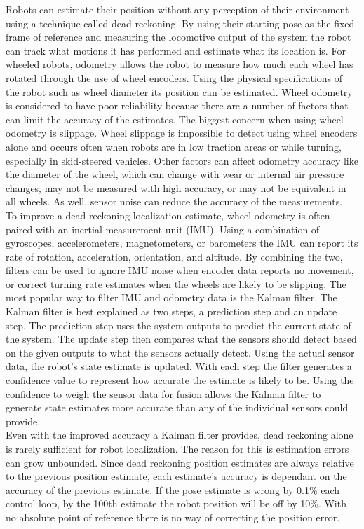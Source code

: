 Robots can estimate their position without any perception of their environment using a technique called dead reckoning. By using their starting pose as the fixed frame of reference and measuring the locomotive output of the system the robot can track what motions it has performed and estimate what its location is. For wheeled robots, odometry allows the robot to measure how much each wheel has rotated through the use of wheel encoders. Using the physical specifications of the robot such as wheel diameter its position can be estimated. Wheel odometry is considered to have poor reliability because there are a number of factors that can limit the accuracy of the estimates. The biggest concern when using wheel odometry is slippage. Wheel slippage is impossible to detect using wheel encoders alone and occurs often when robots are in low traction areas or while turning, especially in skid-steered vehicles. Other factors can affect odometry accuracy like the diameter of the wheel, which can change with wear or internal air pressure changes, may not be measured with high accuracy, or may not be equivalent in all wheels. As well, sensor noise can reduce the accuracy of the measurements.\\

To improve a dead reckoning localization estimate, wheel odometry is often paired with an inertial measurement unit (IMU). Using a combination of gyroscopes, accelerometers, magnetometers, or barometers the IMU can report its rate of rotation, acceleration, orientation, and altitude. By combining the two, filters can be used to ignore IMU noise when encoder data reports no movement, or correct turning rate estimates when the wheels are likely to be slipping. The most popular way to filter IMU and odometry data is the Kalman filter. The Kalman filter is best explained as two steps, a prediction step and an update step. The prediction step uses the system outputs to predict the current state of the system. The update step then compares what the sensors should detect based on the given outputs to what the sensors actually detect. Using the actual sensor data, the robot's state estimate is updated. With each step the filter generates a confidence value to represent how accurate the estimate is likely to be. Using the confidence to weigh the sensor data for fusion allows the Kalman filter to generate state estimates more accurate than any of the individual sensors could provide.\\

Even with the improved accuracy a Kalman filter provides, dead reckoning alone is rarely sufficient for robot localization. The reason for this is estimation errors can grow unbounded. Since dead reckoning position estimates are always relative to the previous position estimate, each estimate's accuracy is dependant on the accuracy of the previous estimate. If the pose estimate is wrong by 0.1\% each control loop, by the 100th estimate the robot position will be off by 10\%. With no absolute point of reference there is no way of correcting the position error.\\

